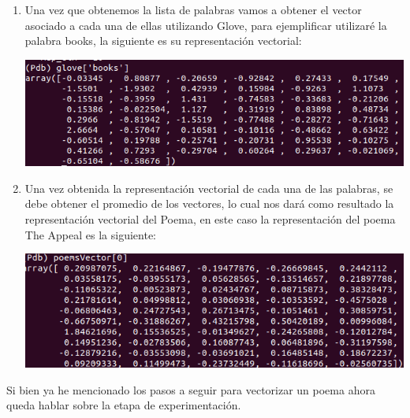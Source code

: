 \documentclass[a4paper, 11pt, oneside]{article}
\begin{document}
\begin{enumerate}
\item Una vez que obtenemos la lista de palabras vamos a obtener el vector asociado a cada una de ellas utilizando Glove, para ejemplificar utilizaré la palabra books, la siguiente es su representación vectorial:
\begin{center}
    \includegraphics[scale=0.50]{Imagenes/booksglove.png}
\end{center}
\item Una vez obtenida la representación vectorial de cada una de las palabras, se debe obtener el promedio de los vectores, lo cual nos dará como resultado la representación vectorial del Poema, en este caso la representación del poema The Appeal es la siguiente:
\begin{center}
    \includegraphics[scale=0.50]{Imagenes/poemvec.png}
\end{center}
\end{enumerate}
Si bien ya he mencionado los pasos a seguir para vectorizar un poema ahora queda hablar sobre la etapa de experimentación.
\end{document}
